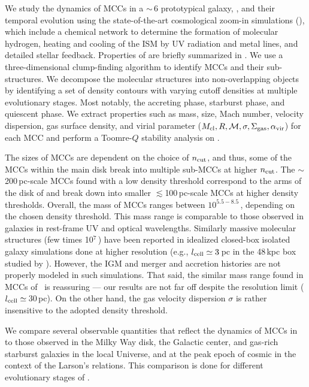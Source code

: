 \IfFileExists{emulateapjlegacy.cls}{\documentclass[iop]{emulateapjlegacy}}{\documentclass[iop]{emulateapj}}
\begin{document}
We study the dynamics of MCCs in a \z$\sim$\,6 prototypical galaxy, \flower,
and their temporal evolution using the state-of-the-art cosmological zoom-in simulations (),
which include a chemical network to determine the formation of molecular hydrogen, heating and cooling of the ISM by
UV radiation and metal lines, and detailed stellar feedback.
Properties of \flower are briefly summarized in .
We use a three-dimensional clump-finding algorithm to identify MCCs and their sub-structures. 
We decompose the molecular structures into non-overlapping objects by identifying a set of 
density contours with varying cutoff densities at multiple evolutionary stages. 
Most notably, the accreting phase, starburst phase, and quiescent phase. 
We extract properties such as mass, size, Mach number, velocity
dispersion, gas surface density, and virial parameter ($M_{\rm cl}, R, \mathcal{M}, 
\sigma, \Sigma_{\rm gas}, \alpha_{\rm vir}$) for each MCC and perform a Toomre-$Q$ stability analysis on \flower.


The sizes of MCCs are dependent on the choice of $n_{\rm cut}$, 
and thus, some of the MCCs within the main disk break into multiple sub-MCCs at higher $n_{\rm cut}$. 
The $\sim$200\,pc-scale MCCs found with a low density threshold
correspond to the arms of the disk of \flower and break down into smaller $\lesssim$100\,pc-scale MCCs at higher density thresholds.
Overall, the mass of MCCs ranges between $10^{5.5-8.5}$\,\Msun, depending on the chosen density threshold.
This mass range is comparable to those observed in \z{} galaxies in rest-frame UV and optical wavelengths.
Similarly massive molecular structures (few times 10$^7$\,\Msun) have been 
reported in idealized closed-box isolated galaxy simulations done at higher resolution (e.g., $l_{\rm cell}\simeq3$\,pc in the 
48\,kpc box studied by \citealt{Behrendt16a}). 
However, the IGM and merger and accretion histories are not properly modeled in such simulations. 
That said, the similar mass range found in MCCs of \flower\ is
reassuring --- our results are not far off despite the resolution limit ($l_{\rm cell}\simeq$\,30\,pc).
On the other hand, the gas velocity dispersion $\sigma$ is rather insensitive to the adopted density threshold.

We compare several observable quantities that reflect the dynamics of MCCs in \flower to those
observed in the Milky Way disk, the Galactic center, and 
gas-rich starburst galaxies in the local Universe, and at the peak epoch of cosmic \SF in the context of the Larson's relations. 
This comparison is done for different evolutionary stages of \flower.
\end{document}
